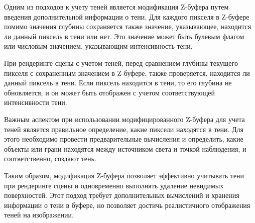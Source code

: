 Одним из подходов к учету теней является модификация Z-буфера путем введения дополнительной информации о тени. Для каждого пикселя в Z-буфере помимо значения глубины сохраняется также значение, указывающее, находится ли данный пиксель в тени или нет. Это значение может быть булевым флагом или числовым значением, указывающим интенсивность тени.

При рендеринге сцены с учетом теней, перед сравнением глубины текущего пикселя с сохраненным значением в Z-буфере, также проверяется, находится ли данный пиксель в тени. Если пиксель находится в тени, то его глубина не обновляется, и он может быть отображен с учетом соответствующей интенсивности тени.

Важным аспектом при использовании модифицированного Z-буфера для учета теней является правильное определение, какие пиксели находятся в тени. Для этого необходимо провести предварительные вычисления и определить, какие объекты или грани находятся между источником света и точкой наблюдения, и соответственно, создают тень.

Таким образом, модификация Z-буфера позволяет эффективно учитывать тени при рендеринге сцены и одновременно выполнять удаление невидимых поверхностей. Этот подход требует дополнительных вычислений и хранения информации о тени в буфере, но позволяет достичь реалистичного отображения теней на изображении.